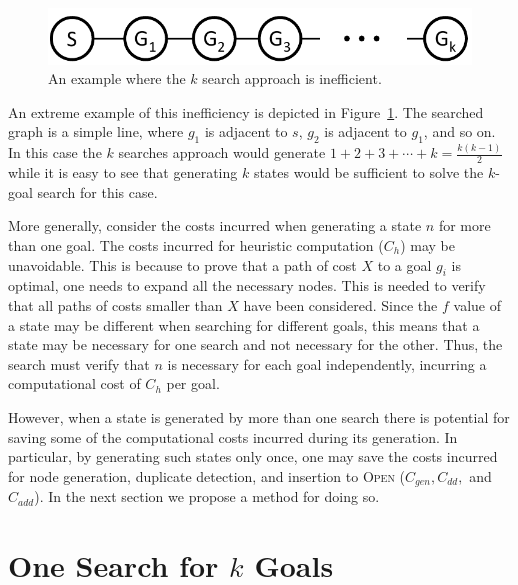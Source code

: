 \documentclass{aicom2e}
\newcommand{\kgs}{$k$-goal search}
\newcommand{\open}{\textsc{Open}}
\begin{document}
\begin{figure}
	\includegraphics[width=\columnwidth]{k-search-bad_cropped}
	\caption{An example where the $k$ search approach is inefficient.}
	\label{fig:k-search-bad}
\end{figure}
An extreme example of this inefficiency is depicted in Figure~\ref{fig:k-search-bad}. The searched graph is a simple line, 
where $g_1$ is adjacent to $s$, $g_2$ is adjacent to $g_1$, and so on. In this case the $k$ searches approach would generate
$1+2+3+\cdots+k=\frac{k(k-1)}{2}$ while it is easy to see that generating $k$ states would be sufficient to solve the \kgs{} for this case. 


More generally, consider the costs incurred when generating a state $n$ for more than one goal. 
The costs incurred for heuristic computation ($C_{h}$) may be unavoidable. This is because to prove that a path of cost $X$ to a goal $g_i$ is optimal, one needs to expand all the necessary nodes. 
This is needed to verify that all paths of costs smaller than $X$ have been considered. Since the $f$ value of a state may be different when searching for different goals, this means that a state may be necessary for one search and not necessary for the other. Thus, the search must verify that $n$ is necessary for each goal independently, incurring a computational cost of $C_{h}$ per goal. 

However, when a state is generated by more than one search there is potential for saving some of the computational costs incurred during its generation. In particular, by generating such states only once, one may save the costs incurred for node generation, duplicate detection, and insertion to \open{} ($C_{gen}, C_{dd},$ and $C_{add}$). In the next section we propose a method for doing so. 



\section{One Search for $k$ Goals}
\end{document}
